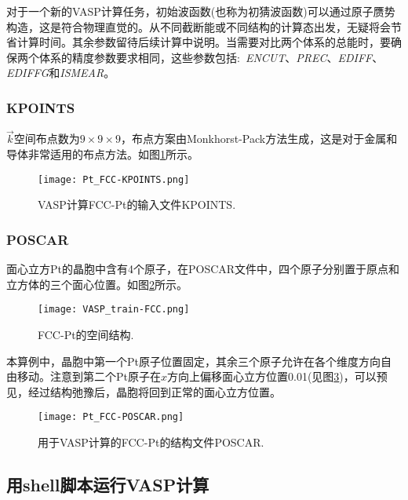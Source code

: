 对于一个新的\textrm{VASP}计算任务，初始波函数(也称为初猜波函数)可以通过原子赝势构造，这是符合物理直觉的。从不同截断能或不同结构的计算态出发，无疑将会节省计算时间。其余参数留待后续计算中说明。当需要对比两个体系的总能时，要确保两个体系的精度参数要求相同，这些参数包括:~\textit{ENCUT}、\textit{PREC}、\textit{EDIFF}、\textit{EDIFFG}和\textit{ISMEAR}。
\subsubsection{\rm{KPOINTS}}
$\vec k$空间布点数为$9\times9\times9$，布点方案由\textrm{Monkhorst-Pack}方法生成，这是对于金属和导体非常适用的布点方法。如图\ref{Pt_FCC:KPOINTS}所示。
\begin{figure}[h!]
\centering
\texttt{[image: Pt\_FCC-KPOINTS.png]}
\caption{\small \textrm{VASP}计算\textrm{FCC-Pt}的输入文件\textrm{KPOINTS}.}%
\label{Pt_FCC:KPOINTS}
\end{figure}
\subsubsection{\rm{POSCAR}}
面心立方\textrm{Pt}的晶胞中含有4个原子，在\textrm{POSCAR}文件中，四个原子分别置于原点和立方体的三个面心位置。如图\ref{Pt_FCC:structure}所示。
\begin{figure}[h!]
\centering
\texttt{[image: VASP\_train-FCC.png]}
\caption{\small \textrm{FCC-Pt}的空间结构.}%
\label{Pt_FCC:structure}
\end{figure}

本算例中，晶胞中第一个\textrm{Pt}原子位置固定，其余三个原子允许在各个维度方向自由移动。注意到第二个\textrm{Pt}原子在$x$方向上偏移面心立方位置0.01(见图\ref{Pt_FCC:POSCAR})，可以预见，经过结构弛豫后，晶胞将回到正常的面心立方位置。
\begin{figure}[h!]
\centering
\texttt{[image: Pt\_FCC-POSCAR.png]}
\caption{\small 用于\textrm{VASP}计算的\textrm{FCC-Pt}的结构文件\textrm{POSCAR}.}%
\label{Pt_FCC:POSCAR}
\end{figure}

\subsection{用shell脚本运行VASP计算}
